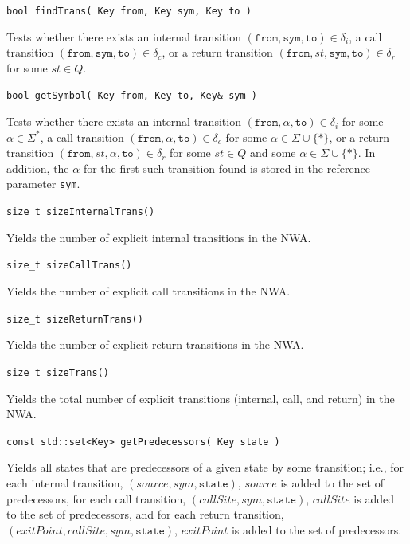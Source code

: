 \documentclass{llncs}
\begin{document}
\begin{description}

  \item\texttt{bool findTrans( Key from, Key sym, Key to )} \nopagebreak

    Tests whether there exists an internal transition
    $(\texttt{from},\texttt{sym},\texttt{to}) \in \delta_i$, a call
    transition $(\texttt{from},\texttt{sym},\texttt{to}) \in \delta_c$, or a
    return transition $(\texttt{from},st,\texttt{sym},\texttt{to}) \in
    \delta_r$ for some $st \in Q$.

  \item\texttt{bool getSymbol( Key from, Key to, Key\& sym )} \nopagebreak

    Tests whether there exists an internal transition
    $(\texttt{from},\alpha,\texttt{to}) \in \delta_i$ for some $\alpha \in
    \Sigma^*$, a call transition $(\texttt{from},\alpha,\texttt{to}) \in
    \delta_c$ for some $\alpha \in \Sigma \cup \{*\}$, or a return transition
    $(\texttt{from},st,\alpha,\texttt{to}) \in \delta_r$ for some $st \in Q$
    and some $\alpha \in \Sigma \cup \{*\}$.  In addition, the $\alpha$ for
    the first such transition found is stored in the reference parameter
    \texttt{sym}.

  \item\texttt{size\_t sizeInternalTrans()} \nopagebreak

    Yields the number of explicit internal transitions in the NWA.

  \item\texttt{size\_t sizeCallTrans()} \nopagebreak

    Yields the number of explicit call transitions in the NWA.

  \item\texttt{size\_t sizeReturnTrans()} \nopagebreak

    Yields the number of explicit return transitions in the NWA.

  \item\texttt{size\_t sizeTrans()} \nopagebreak

    Yields the total number of explicit transitions (internal, call, and
    return) in the NWA.

  \item\texttt{const std::set<Key> getPredecessors( Key state )} \nopagebreak

    Yields all states that are predecessors of a given state by some
    transition; i.e., for each internal transition,
    $(source,sym,\texttt{state})$, $source$ is added to the set of
    predecessors, for each call transition, $(callSite,sym,\texttt{state})$,
    $callSite$ is added to the set of predecessors, and for each return
    transition, $(exitPoint,callSite,sym,\texttt{state})$, $exitPoint$ is
    added to the set of predecessors.


\end{description}
\end{document}
